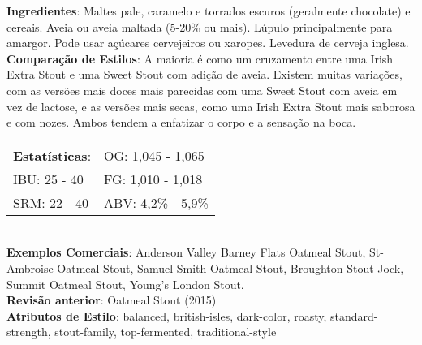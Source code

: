 \textbf{Ingredientes}: Maltes pale, caramelo e torrados escuros (geralmente chocolate) e cereais. Aveia ou aveia maltada (5-20\% ou mais). Lúpulo principalmente para amargor. Pode usar açúcares cervejeiros ou xaropes. Levedura de cerveja inglesa. \\
\textbf{Comparação de Estilos}: A maioria é como um cruzamento entre uma Irish Extra Stout e uma Sweet Stout com adição de aveia. Existem muitas variações, com as versões mais doces mais parecidas com uma Sweet Stout com aveia em vez de lactose, e as versões mais secas, como uma Irish Extra Stout mais saborosa e com nozes. Ambos tendem a enfatizar o corpo e a sensação na boca. \\
\begin{tabular}{@{}p{35mm}p{35mm}@{}}
  \textbf{Estatísticas}: & OG: 1,045 - 1,065 \\
  IBU: 25 - 40  & FG: 1,010 - 1,018 \\
  SRM: 22 - 40  & ABV: 4,2\% - 5,9\%
\end{tabular}\\
\textbf{Exemplos Comerciais}: Anderson Valley Barney Flats Oatmeal Stout, St-Ambroise Oatmeal Stout, Samuel Smith Oatmeal Stout, Broughton Stout Jock, Summit Oatmeal Stout, Young's London Stout. \\
\textbf{Revisão anterior}: Oatmeal Stout (2015) \\
\textbf{Atributos de Estilo}: balanced, british-isles, dark-color, roasty, standard-strength, stout-family, top-fermented, traditional-style
